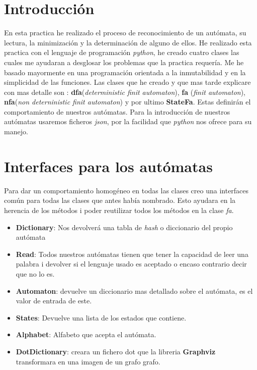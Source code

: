 \documentclass{article}
\begin{document}
    \section{Introducción}\label{sec:introducción}
    En esta practica he realizado el proceso de reconocimiento de un autómata, su lectura, la minimización y la determinación de alguno de ellos.
    He realizado esta practica con el lenguaje de programación \textit{python}, he creado cuatro clases las cuales me ayudaran a desglosar los problemas que la practica requería.
    Me he basado mayormente en una programación orientada a la inmutabilidad y en la simplicidad de las funciones.
    Las clases que he creado y que mas tarde explicare con mas detalle son : \textbf{dfa}(\textit{deterministic finit automaton}), \textbf{fa} (\textit{finit automaton}), \textbf{nfa}(\textit{non deterninistic finit automaton}) y por ultimo  \textbf{StateFa}.
    Estas definirán el comportamiento de nuestros autómatas.
    Para la introducción de nuestros autómatas usaremos ficheros \textit{json}, por la facilidad que \textit{python} nos ofrece para su manejo.



    \section{Interfaces para los autómatas}\label{sec:interfaces-para-los-autómatas}
    Para dar un comportamiento homogéneo en todas las clases creo una interfaces común para todas las clases que antes había nombrado. Esto ayudara en la herencia de los métodos i poder reutilizar todos los métodos en la clase \textit{fa}.
    \begin{itemize}
        \item \textbf{Dictionary}: Nos devolverá una tabla de \textit{hash} o diccionario del propio autómata
        \item \textbf{Read}: Todos nuestros autómatas tienen que tener la capacidad de leer una palabra i devolver si el lenguaje usado es aceptado o encaso contrario decir que no lo es.
        \item \textbf{Automaton}: devuelve un diccionario mas detallado sobre el autómata, es el valor de entrada de este.
        \item \textbf{States}: Devuelve una lista de los estados que contiene.
        \item \textbf{Alphabet}: Alfabeto que acepta el autómata.
        \item \textbf{DotDictionary}: creara un fichero dot que la libreria \textbf{Graphviz} transformara en una imagen de un grafo grafo.
    \end{itemize}
\end{document}

